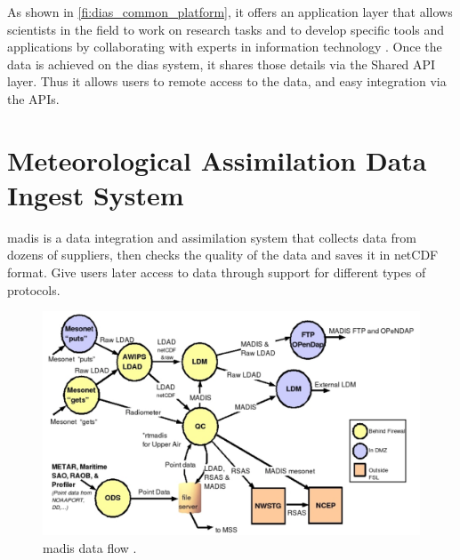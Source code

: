 As shown in \cref{fi:dias_common_platform}, it offers an application layer that allows scientists in the field to work on research tasks and to develop specific tools and applications by collaborating with experts in information technology \cite{Kawasaki2018DataReduction}. Once the data is achieved on the \acrshort{dias} system, it shares those details via the Shared API layer. Thus it allows users to remote access to the data, and easy integration via the APIs.



\section{Meteorological Assimilation Data Ingest System}
\label{se:madis}
\acrfull{madis} is a data integration and assimilation system that collects data from dozens of suppliers, then checks the quality of the data and saves it in \acrshort{netCDF} format. Give users later access to data through support for different types of protocols.


\begin{figure}[htp]
    \centering
    \includegraphics[width=1\textwidth]{lit/other/madis_flow.png}
    \caption[\acrshort{madis} data flow]{\acrshort{madis} data flow \cite{Macdermaid2005ARCHITECTUREP2.39}.}
    \label{fi:madis_flow}
\end{figure}


